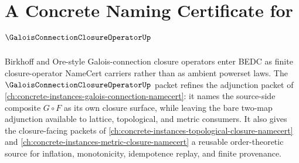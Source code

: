 \chapter{A Concrete Naming Certificate for $\GaloisConnectionClosureOperatorUp$}
\label{ch:concrete-instances-galois-connection-closure-operator-namecert}

Birkhoff and Ore-style Galois-connection closure operators enter BEDC as finite closure-operator NameCert carriers rather than as ambient powerset laws. The $\GaloisConnectionClosureOperatorUp$ packet refines the adjunction packet of \autoref{ch:concrete-instances-galois-connection-namecert}: it names the source-side composite $G\circ F$ as its own closure surface, while leaving the bare two-map adjunction available to lattice, topological, and metric consumers. It also gives the closure-facing packets of \autoref{ch:concrete-instances-topological-closure-namecert} and \autoref{ch:concrete-instances-metric-closure-namecert} a reusable order-theoretic source for inflation, monotonicity, idempotence replay, and finite provenance.

